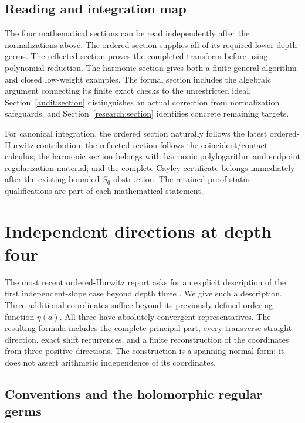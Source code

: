 \documentclass[11pt,a4paper]{article}
\numberwithin{equation}{section}
\theoremstyle{definition}
\theoremstyle{remark}
\begin{document}
\subsection{Reading and integration map}

The four mathematical sections can be read independently after the
normalizations above. The ordered section supplies all of its required
lower-depth germs. The reflected section proves the completed transform
before using polynomial reduction. The harmonic section gives both a
finite general algorithm and closed low-weight examples. The formal
section includes the algebraic argument connecting its finite exact
checks to the unrestricted ideal. Section~\ref{audit:section} distinguishes
an actual correction from normalization safeguards, and
Section~\ref{research:section} identifies concrete remaining targets.

For canonical integration, the ordered section naturally follows the
latest ordered-Hurwitz contribution; the reflected section follows the
coincident/contact calculus; the harmonic section belongs with harmonic
polylogarithm and endpoint regularization material; and the complete
Cayley certificate belongs immediately after the existing bounded
$S_6$ obstruction. The retained proof-status qualifications are part of
each mathematical statement.



\section{Independent directions at depth four}
\label{oq:section}

The most recent ordered-Hurwitz report asks for an explicit description of
the first independent-slope case beyond depth three
\cite[Questions 1--2]{RepoOrdered}. We give such a description. Three
additional coordinates suffice beyond its previously defined ordering
function $\eta(a)$. All three have absolutely convergent representatives.
The resulting formula includes the complete principal part, every
transverse straight direction, exact shift recurrences, and a finite
reconstruction of the coordinates from three positive directions.
The construction is a spanning normal form; it does not assert arithmetic
independence of its coordinates.

\subsection{Conventions and the holomorphic regular germs}
\end{document}
